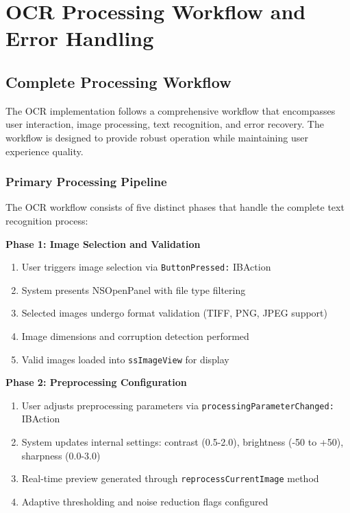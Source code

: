 \section{OCR Processing Workflow and Error Handling}

\subsection{Complete Processing Workflow}

The OCR implementation follows a comprehensive workflow that encompasses user interaction, image processing, text recognition, and error recovery. The workflow is designed to provide robust operation while maintaining user experience quality.

\subsubsection{Primary Processing Pipeline}

The OCR workflow consists of five distinct phases that handle the complete text recognition process:

\textbf{Phase 1: Image Selection and Validation}
\begin{enumerate}
\item User triggers image selection via \texttt{ButtonPressed:} IBAction
\item System presents NSOpenPanel with file type filtering
\item Selected images undergo format validation (TIFF, PNG, JPEG support)
\item Image dimensions and corruption detection performed
\item Valid images loaded into \texttt{ssImageView} for display
\end{enumerate}

\textbf{Phase 2: Preprocessing Configuration}
\begin{enumerate}
\item User adjusts preprocessing parameters via \texttt{processingParameterChanged:} IBAction
\item System updates internal settings: contrast (0.5-2.0), brightness (-50 to +50), sharpness (0.0-3.0)
\item Real-time preview generated through \texttt{reprocessCurrentImage} method
\item Adaptive thresholding and noise reduction flags configured
\end{enumerate}

